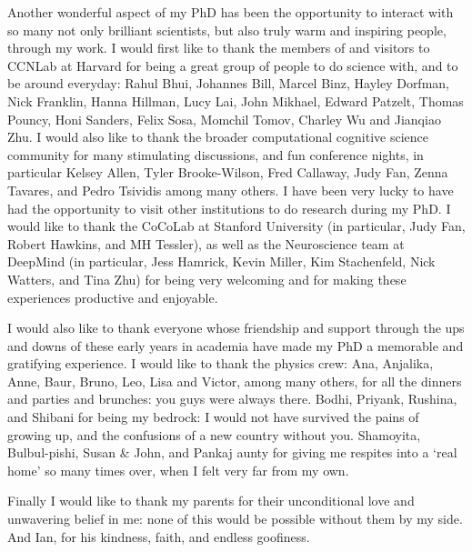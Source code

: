Another wonderful aspect of my PhD has been the opportunity to interact with so many not only brilliant scientists, but also truly warm and inspiring people, through my work. I would first like to thank the members of and visitors to CCNLab at Harvard for being a great group of people to do science with, and to be around everyday: Rahul Bhui, Johannes Bill, Marcel Binz, Hayley Dorfman, Nick Franklin, Hanna Hillman, Lucy Lai, John Mikhael, Edward Patzelt, Thomas Pouncy, Honi Sanders, Felix Sosa,  Momchil Tomov, Charley Wu and Jianqiao Zhu. I would also like to thank the broader computational cognitive science community for many stimulating discussions, and fun conference nights, in particular Kelsey Allen, Tyler Brooke-Wilson, Fred Callaway, Judy Fan,  Zenna Tavares, and Pedro Tsividis among many others. I have been very lucky to have had the opportunity to visit other institutions to do research during my PhD. I would like to thank the CoCoLab at Stanford University (in particular, Judy Fan, Robert Hawkins, and MH Tessler), as well as the Neuroscience team at DeepMind (in particular, Jess Hamrick, Kevin Miller, Kim Stachenfeld, Nick Watters, and Tina Zhu) for being very welcoming and for making these experiences productive and enjoyable.

I would also like to thank everyone whose friendship and support through the ups and downs of these early years in academia have made my PhD a memorable and gratifying experience. I would like to thank the physics crew: Ana, Anjalika, Anne, Baur, Bruno, Leo, Lisa and Victor, among many others, for all the dinners and parties and brunches: you guys were always there. Bodhi, Priyank, Rushina, and Shibani for being my bedrock: I would not have survived the pains of growing up, and the confusions of a new country without you. Shamoyita, Bulbul-pishi, Susan \& John, and Pankaj aunty for giving me respites into a `real home' so many times over, when I felt very far from my own.

Finally I would like to thank my parents for their unconditional love and unwavering belief in me: none of this would be possible without them by my side. And Ian, for his kindness, faith, and endless goofiness.

%
%
%
%
%
%
%
%



